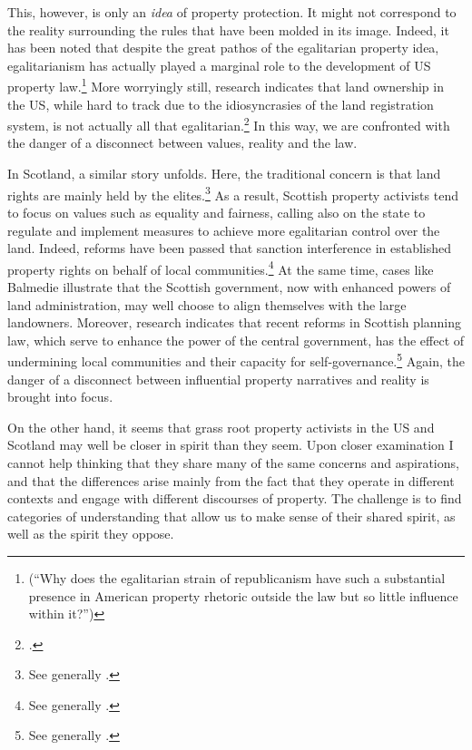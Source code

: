 This, however, is only an {\it idea} of property protection. It might not correspond to the reality surrounding the rules that have been molded in its image. Indeed, it has been noted that despite the great pathos of the egalitarian property idea, egalitarianism has actually played a marginal role to the development of US property law.\footnote{\cite[361]{williams98} (``Why does the egalitarian strain of republicanism have such a substantial presence in American property rhetoric outside the law but so little influence within it?'')} More worryingly still, research indicates that land ownership in the US, while hard to track due to the idiosyncrasies of the land registration system, is not actually all that egalitarian.\footcite[246-247]{jacobs98} In this way, we are confronted with the danger of a disconnect between  values, reality and the law.

In Scotland, a similar story unfolds. Here, the traditional concern is that land rights are mainly held by the elites.\footnote{See generally \cite{wightman96,wightman13}.} As a result, Scottish property activists tend to focus on values such as equality and fairness, calling also on the state to regulate and implement measures to achieve more egalitarian control over the land. Indeed, reforms have been passed that sanction interference in established property rights on behalf of local communities.\footnote{See generally \cite{lovett11,hoffman13}.} At the same time, cases like Balmedie illustrate that the Scottish government, now with enhanced powers of land administration, may well choose to align themselves with the large landowners. Moreover, research indicates that recent reforms in Scottish planning law, which serve to enhance the power of the central government, has the effect of undermining local communities and their capacity for self-governance.\footnote{See generally \cite{pacione13,pacione14}.} Again, the danger of a disconnect between influential property narratives and reality is brought into focus.

On the other hand, it seems that grass root property activists in the US and Scotland may well be closer in spirit than they seem. Upon closer examination I cannot help thinking that they share many of the same concerns and aspirations, and that the differences arise mainly from the fact that they operate in different contexts and engage with different discourses of property. The challenge is to find categories of understanding that allow us to make sense of their shared spirit, as well as the spirit they oppose.

